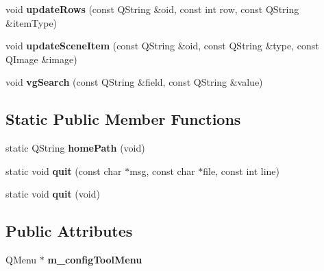 \begin{DoxyCompactItemize}
\item 
void {\bfseries update\+Rows} (const Q\+String \&oid, const int row, const Q\+String \&item\+Type)\hypertarget{classbiblioteq_a486b9abc9d7c0d682c1d991c1cf81496}{}\label{classbiblioteq_a486b9abc9d7c0d682c1d991c1cf81496}

\item 
void {\bfseries update\+Scene\+Item} (const Q\+String \&oid, const Q\+String \&type, const Q\+Image \&image)\hypertarget{classbiblioteq_aa95f6bd6c1294be28f09d7e7454aa35b}{}\label{classbiblioteq_aa95f6bd6c1294be28f09d7e7454aa35b}

\item 
void {\bfseries vg\+Search} (const Q\+String \&field, const Q\+String \&value)\hypertarget{classbiblioteq_a9b3730fd94a7ff095b983f25b0934ca9}{}\label{classbiblioteq_a9b3730fd94a7ff095b983f25b0934ca9}

\end{DoxyCompactItemize}
\subsection*{Static Public Member Functions}
\begin{DoxyCompactItemize}
\item 
static Q\+String {\bfseries home\+Path} (void)\hypertarget{classbiblioteq_a77dff33726661558d8d93b8b681d8650}{}\label{classbiblioteq_a77dff33726661558d8d93b8b681d8650}

\item 
static void {\bfseries quit} (const char $\ast$msg, const char $\ast$file, const int line)\hypertarget{classbiblioteq_aaddc108d0fe310ea1af60fed14bc80f3}{}\label{classbiblioteq_aaddc108d0fe310ea1af60fed14bc80f3}

\item 
static void {\bfseries quit} (void)\hypertarget{classbiblioteq_a3ffe0cfcba2b0bda0cd13e79047d25d6}{}\label{classbiblioteq_a3ffe0cfcba2b0bda0cd13e79047d25d6}

\end{DoxyCompactItemize}
\subsection*{Public Attributes}
\begin{DoxyCompactItemize}
\item 
Q\+Menu $\ast$ {\bfseries m\+\_\+config\+Tool\+Menu}\hypertarget{classbiblioteq_a221649d43f277d9ab329144b2af8dca9}{}\label{classbiblioteq_a221649d43f277d9ab329144b2af8dca9}

\end{DoxyCompactItemize}

